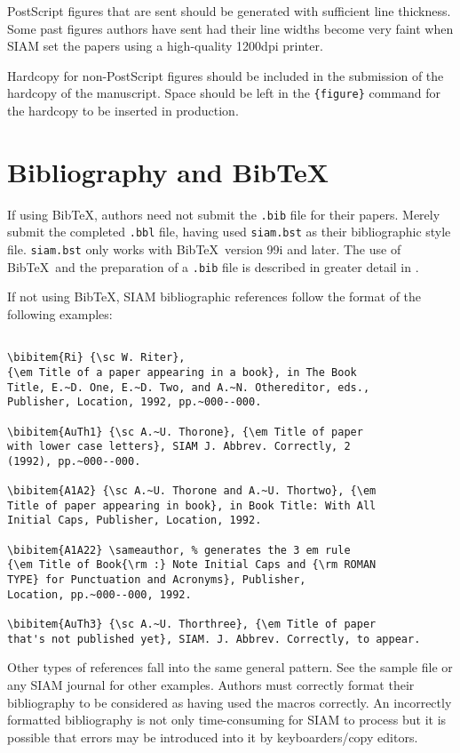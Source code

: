 \documentclass[final,leqno,onefignum,onetabnum]{siamltex1213}
\begin{document}
{\sc PostScript} figures that are sent should be generated with
sufficient line thickness. Some past figures authors have sent
had their line widths become very faint when SIAM set the papers
using a high-quality 1200dpi printer.

Hardcopy for non-{\sc PostScript} figures should be included in
the submission of the hardcopy of the manuscript. Space
should be left in the \verb|{figure}| command for the
hardcopy to be inserted in production.

\section{Bibliography and Bib\TeX}

If using {\sc Bib}\TeX, authors need not submit the {\tt .bib} file for
their papers. Merely submit the completed {\tt .bbl} file, having used
{\tt siam.bst} as their bibliographic style file. {\tt siam.bst}
only works with Bib\TeX\ version 99i and later. The use of
Bib\TeX\ and the preparation of a {\tt .bib} file is
described in greater detail in \cite{Lamport}.

If not using Bib\TeX, SIAM bibliographic references follow
the format of the following examples:

\begin{verbatim}

\bibitem{Ri} {\sc W. Riter},
{\em Title of a paper appearing in a book}, in The Book 
Title, E.~D. One, E.~D. Two, and A.~N. Othereditor, eds., 
Publisher, Location, 1992, pp.~000--000.

\bibitem{AuTh1} {\sc A.~U. Thorone}, {\em Title of paper
with lower case letters}, SIAM J. Abbrev. Correctly, 2
(1992), pp.~000--000.

\bibitem{A1A2} {\sc A.~U. Thorone and A.~U. Thortwo}, {\em
Title of paper appearing in book}, in Book Title: With All
Initial Caps, Publisher, Location, 1992.

\bibitem{A1A22} \sameauthor, % generates the 3 em rule
{\em Title of Book{\rm :} Note Initial Caps and {\rm ROMAN
TYPE} for Punctuation and Acronyms}, Publisher,
Location, pp.~000--000, 1992.

\bibitem{AuTh3} {\sc A.~U. Thorthree}, {\em Title of paper
that's not published yet}, SIAM. J. Abbrev. Correctly, to appear.

\end{verbatim}

Other types of references fall into the same general
pattern. See the sample file or any SIAM journal for other
examples. Authors must correctly format their bibliography to
be considered as having used the macros correctly. An incorrectly 
formatted bibliography is not only time-consuming for SIAM to
process but it is possible that errors may be introduced into 
it by keyboarders/copy editors.
\end{document}
